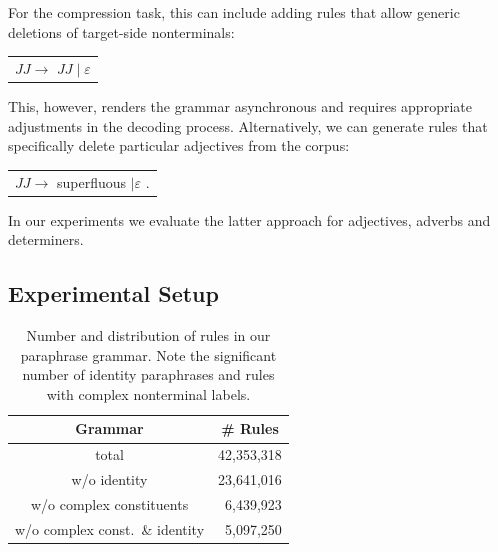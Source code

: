 \documentclass[11pt]{article}
\begin{document}
For the compression task, this can include adding rules that allow
generic deletions of target-side nonterminals:
\begin{center}
\begin{tabular}{c}
 $\mathit{JJ} \rightarrow$ $\mathit{JJ} \mid \varepsilon$ \\
\end{tabular}
\end{center}
This, however, renders the grammar asynchronous and requires
appropriate adjustments in the decoding process. Alternatively, we can
generate rules that specifically delete particular adjectives from the
corpus:
\begin{center}
\begin{tabular}{c}
 $\mathit{JJ} \rightarrow$ superfluous $\mid \varepsilon$ .\\
\end{tabular}
\end{center}
In our experiments we evaluate the latter approach for adjectives,
adverbs and determiners.


\subsection{Experimental Setup}
\label{setup}

\begin{table}
\small
\begin{center}
\begin{tabular}{|c|r|}
  \hline
  Grammar & \multicolumn{1}{c|}{\# Rules} \\
  \hline
  total & 42,353,318 \\
  w/o identity & 23,641,016 \\
  w/o complex constituents & 6,439,923 \\
  w/o complex const.\ \& identity & 5,097,250 \\
  \hline
\end{tabular}
\end{center}
\normalsize
\caption{Number and distribution of rules in our paraphrase
  grammar. Note the significant number of identity paraphrases and
  rules with complex nonterminal labels.}
\label{grammar_stats}
\end{table}
\end{document}
